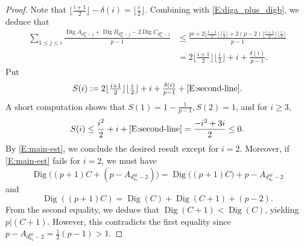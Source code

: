 \begin{proof}
    Note that $\lfloor\frac{i+1}{2}\rfloor-\delta(i)=\lfloor\frac{i}{2}\rfloor$. Combining with \eqref{E:diga_plus_digb}, we deduce that
    \begin{align*}
    \displaystyle \sum_{1 \leq j \leq i}
    \frac{{\operatorname{Dig}}A_{d_{k_0}^{\mathrm{ur}}- j} +{\operatorname{Dig}}B_{d_{k_0}^{\mathrm{ur}}- j} - 2 {\operatorname{Dig}}C_{d_{k_0}^{\mathrm{ur}}- j}}{p-1}&\leq \frac{pi +2\lfloor\frac{i-1}{2}\rfloor\lfloor\frac{i}{2}\rfloor+ 2(p-2)\lfloor\frac{i+1}{2}\rfloor\lfloor\frac{i}{2}\rfloor}{p-1} \\
    \nonumber
    &=2\lfloor\tfrac{i+1}{2}\rfloor\lfloor\tfrac{i}{2}\rfloor+i+\tfrac{\delta(i)}{p-1}.
    \end{align*}
    Put
    \[
    S(i):=2\lfloor\tfrac{i+1}{2}\rfloor\lfloor\tfrac{i}{2}\rfloor+i+\tfrac{\delta(i)}{p-1}+ \eqref{E:second-line}.
    \]
    A short computation shows that
    $S(1)=1-\frac{1}{p-1}, S(2)=1$, and for $i\geq3$,
    \[
    S(i)\leq \frac{i^2}{2}+i+\eqref{E:second-line}=\frac{-i^2+3i}{2}\leq0.
    \]
    By \eqref{E:main-est}, we conclude the desired result except for $i=2$. Moreover, if \eqref{E:main-est} fails for $i=2$, we must have
    \[
    {\operatorname{Dig}}\big((p+1)C+(p-A_{d_{k_0}^{\mathrm{ur}}-2})\big)={\operatorname{Dig}}\big((p+1)C\big)+p- A_{d_{k_0}^{\mathrm{ur}}-2}
    \]
    and
    \[
    {\operatorname{Dig}}((p+1)C)={\operatorname{Dig}}(C)+{\operatorname{Dig}}(C+1)+(p-2).
    \]
    From the second equality, we deduce that ${\operatorname{Dig}}(C+1)<{\operatorname{Dig}}(C)$, yielding $p|(C+1)$. However, this contradicts the first equality since $p-A_{d_{k_0}^{\mathrm{ur}}-2}=\tfrac12(p-1)>1$.
\end{proof}
